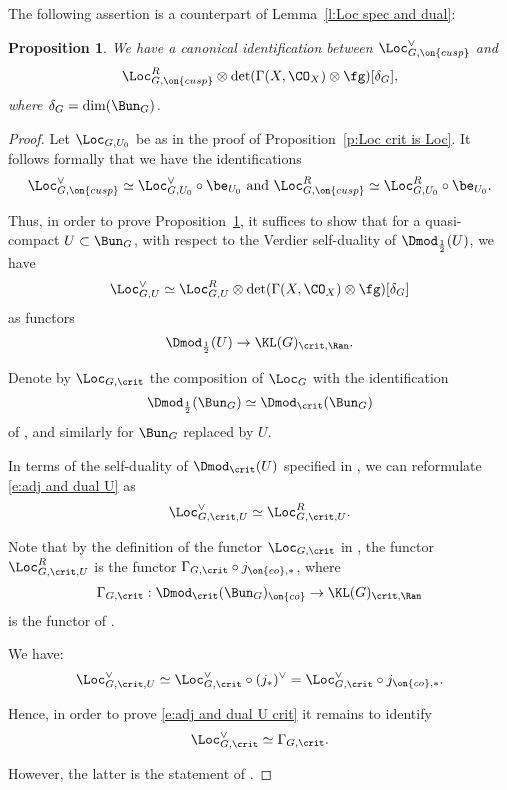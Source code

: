 \documentclass[9pt]{amsart}
\newtheorem{prop}[subsubsection]{Proposition}
\theoremstyle{remark}
\theoremstyle{definition}
\theoremstyle{remark}
\newcommand{\lemref}[1]{Lemma~\ref{#1}}
\newcommand{\propref}[1]{Proposition~\ref{#1}}
\numberwithin{equation}{section}
\begin{document}
The following assertion is a counterpart of \lemref{l:Loc spec and dual}:

\begin{prop} \label{p:Loc crit and dual}
We have a canonical identification between $\Loc_{G,\on{cusp}}^\vee$ and 
$$\Loc_{G,\on{cusp}}^R\otimes \det(\Gamma(X,\CO_X)\otimes \fg)[\delta_G],$$
where $\delta_G=\dim(\Bun_G)$.
\end{prop} 

\begin{proof} 

Let $\Loc_{G,U_0}$ be as in the proof of \propref{p:Loc crit is Loc}. It follows formally that we have the identifications
$$\Loc_{G,\on{cusp}}^\vee \simeq \Loc_{G,U_0}^\vee \circ \be_{U_0} \text{ and }
\Loc_{G,\on{cusp}}^R \simeq \Loc_{G,U_0}^R \circ \be_{U_0}.$$

\medskip

Thus, in order to prove \propref{p:Loc crit and dual}, it suffices to show that for a quasi-compact $U\subset \Bun_G$, 
with respect to the Verdier self-duality of $\Dmod_{\frac{1}{2}}(U)$, we have
\begin{equation} \label{e:adj and dual U}
\Loc_{G,U}^\vee \simeq \Loc_{G,U}^R\otimes \det(\Gamma(X,\CO_X)\otimes \fg)[\delta_G]
\end{equation}
as functors 
$$\Dmod_{\frac{1}{2}}(U) \to \KL(G)_{\crit,\Ran}.$$

\medskip

Denote by $\Loc_{G,\crit}$ the composition of $\Loc_G$ with the identification 
$$\Dmod_{\frac{1}{2}}(\Bun_G)\simeq \Dmod_\crit(\Bun_G)$$
of \cite[Equation (10.2)]{GLC2}, and similarly for $\Bun_G$ replaced by $U$. 

\medskip

In terms of the self-duality of $\Dmod_\crit(U)$ specified in \cite[Sect. 10.5.2]{GLC2}, we can reformulate 
\eqref{e:adj and dual U} as 
\begin{equation} \label{e:adj and dual U crit}
\Loc_{G,\crit,U}^\vee \simeq \Loc_{G,\crit,U}^R.
\end{equation}

Note that by the definition of the functor $\Loc_{G,\crit}$ in \cite[Sect. 11.3.3-11.3.4]{GLC2}, 
the functor $\Loc_{G,\crit,U}^R$ is the functor $\Gamma_{G,\crit}\circ j_{\on{co},*}$, where
$$\Gamma_{G,\crit}:\Dmod_\crit(\Bun_G)_{\on{co}}\to \KL(G)_{\crit,\Ran}$$
is the functor of \cite[Sect. 10.2.5]{GLC2}. 

\medskip

We have:
$$\Loc_{G,\crit,U}^\vee\simeq  \Loc_{G,\crit}^\vee \circ (j_*)^\vee = \Loc_{G,\crit}^\vee\circ j_{\on{co},*}.$$

Hence, in order to prove \eqref{e:adj and dual U crit} it remains to identify
$$\Loc_{G,\crit}^\vee\simeq \Gamma_{G,\crit}.$$

However, the latter is the statement of \cite[Proposition 10.5.7(b)]{GLC2}.

\end{proof}
\end{document}

